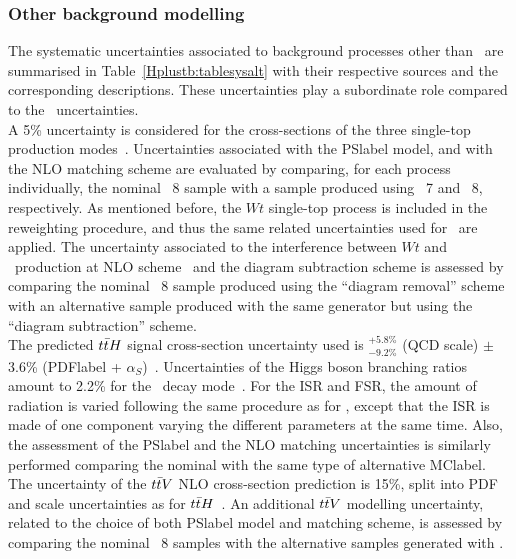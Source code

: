 \subsubsection{Other background modelling}
The systematic uncertainties associated to background processes other than \ttjets\ are summarised in Table~\ref{Hplustb:tablesysalt} with their respective sources and the corresponding descriptions. These uncertainties play a subordinate role compared to the \ttbar\ uncertainties.\\

A 5\% uncertainty is considered for the cross-sections of the three single-top production modes~\cite{Martin_2009,toprecomendation,Martin_2009v2,Aliev_2011,Kant_2015}. Uncertainties associated with the \acrshort{PSlabel} model, and with the NLO matching scheme are evaluated by comparing, for each process individually, the nominal \POWHEGPYTHIA~8 sample with a sample produced using \POWHEGHERWIG~7 and \MGMCatNLOPYTHIA~8, respectively. As mentioned before, the $Wt$ single-top process is included in the reweighting procedure, and thus the same related uncertainties used for \ttbar\ are applied. The uncertainty associated to the interference between $Wt$ and \ttbar\ production at NLO scheme~\cite{Frixione_2008} and the diagram
subtraction scheme is assessed by comparing the nominal \POWHEGPYTHIA~8 sample produced using the “diagram removal” scheme with an alternative sample produced with the same generator but using the “diagram subtraction” scheme.\\

The predicted $t\bar{t} H$ signal cross-section uncertainty used is $^{+5.8\%}_{-9.2\%}$ (QCD scale) $\pm$3.6\% (\acrshort{PDFlabel} + $\alpha_S$)~\cite{Frixione_2008,CYRM-2017-002,PhysRevD.19.941,BEENAKKER2003151,Dawson_2003,Zhang_2014,10.48550/arxiv.1504.03446}. Uncertainties of the Higgs boson branching ratios amount to 2.2\% for the \bbar\ decay mode~\cite{CYRM-2017-002}. For the ISR and FSR, the amount of radiation is varied following the same procedure as for \ttbar, except that the ISR is made of one component varying the different parameters at the same time. Also, the assessment of the \acrshort{PSlabel} and the NLO matching uncertainties is similarly performed comparing the nominal with the same type of alternative \acrshort{MClabel}.\\

The uncertainty of the $t\bar{t} V$ NLO cross-section prediction is 15\%, split into PDF and scale uncertainties as for $t\bar{t} H$~\cite{CYRM-2017-002,Campbell_2012}. An additional $t\bar{t} V$ modelling uncertainty, related to the choice of both \acrshort{PSlabel} model and matching scheme, is assessed by comparing the nominal \MGMCatNLOPYTHIA~8 samples with the alternative samples generated with \SHERPA.\\


